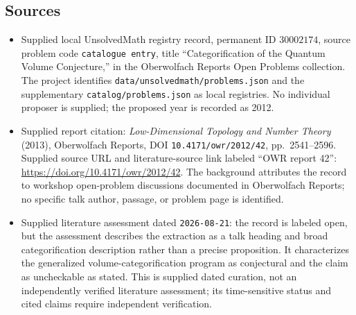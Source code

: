 \documentclass[11pt]{article}
\begin{document}
\subsection{Sources}
\begin{itemize}
\item Supplied local UnsolvedMath registry record, permanent ID \(30002174\), source problem code \texttt{catalogue entry}, title ``Categorification of the Quantum Volume Conjecture,'' in the Oberwolfach Reports Open Problems collection. The project identifies \texttt{data/unsolvedmath/problems.json} and the supplementary \texttt{catalog/problems.json} as local registries. No individual proposer is supplied; the proposed year is recorded as 2012.
\item Supplied report citation: \emph{Low-Dimensional Topology and Number Theory} (2013), Oberwolfach Reports, DOI \texttt{10.4171/owr/2012/42}, pp.\ 2541--2596. Supplied source URL and literature-source link labeled ``OWR report 42'': \url{https://doi.org/10.4171/owr/2012/42}. The background attributes the record to workshop open-problem discussions documented in Oberwolfach Reports; no specific talk author, passage, or problem page is identified.
\item Supplied literature assessment dated \texttt{2026-08-21}: the record is labeled open, but the assessment describes the extraction as a talk heading and broad categorification description rather than a precise proposition. It characterizes the generalized volume-categorification program as conjectural and the claim as uncheckable as stated. This is supplied dated curation, not an independently verified literature assessment; its time-sensitive status and cited claims require independent verification.
\end{itemize}
\end{document}
